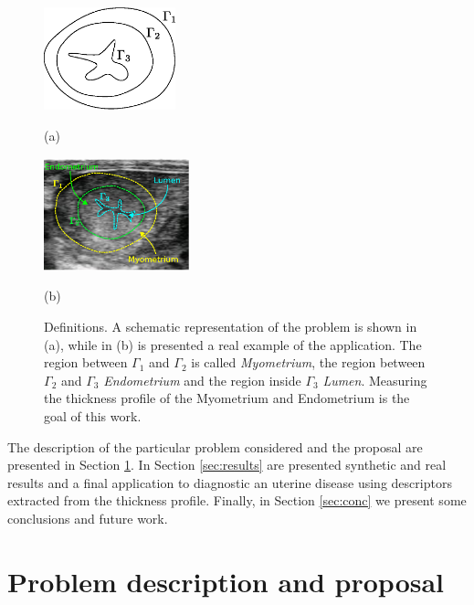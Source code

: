 \documentclass{article}
\begin{document}
\begin{figure}[t]
\begin{minipage}[b]{.45\linewidth}
  \centering
  \centerline{\includegraphics[width=3.8cm]{pics/defs2}}
  \centerline{(a)}\medskip
\end{minipage}\hfill
\begin{minipage}[b]{.52\linewidth}
  \centering
  \centerline{\includegraphics[width=4.2cm]{pics/defsEndo}}
  \centerline{(b)}\medskip
\end{minipage}
\vspace{-10pt}
\caption{Definitions. A schematic representation of the problem is shown in (a), while in (b) is presented a real example of the application. The region between $\Gamma_1$ and $\Gamma_2$ is called \emph{Myometrium}, the region between $\Gamma_2$ and $\Gamma_3$ \emph{Endometrium} and the region inside $\Gamma_3$ \emph{Lumen}. Measuring the thickness profile of the Myometrium and Endometrium is the goal of this work.}
\vspace{-5pt}
\label{fig:defs}
\end{figure}

The description of the particular problem considered and the proposal are presented in Section \ref{sec:proposal}. In Section \ref{sec:results} are presented synthetic and real results and a final application to diagnostic an uterine disease using descriptors extracted from the thickness profile. Finally, in Section \ref{sec:conc} we present some conclusions and future work.


\section{Problem description and proposal}
\label{sec:proposal}
\end{document}
